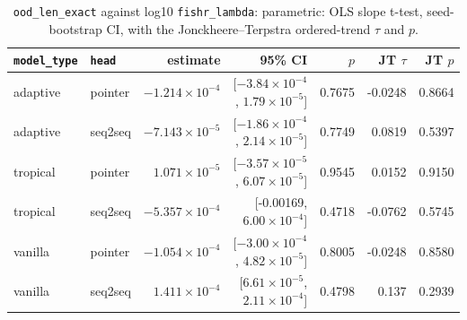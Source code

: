 \documentclass[10pt]{article}
\begin{document}
{\small
\begin{longtable}{llrrrrr}
\caption{\texttt{ood\_len\_exact} against log10 \texttt{fishr\_lambda}: parametric: OLS slope t-test, seed-bootstrap CI, with the Jonckheere--Terpstra ordered-trend $\tau$ and $p$.}\label{tab:trend-ood_len_exact}\\
\toprule
\texttt{model\_type} & \texttt{head} & estimate & 95\% CI & $p$ & JT $\tau$ & JT $p$\\
\midrule
\endhead
adaptive & pointer & $-1.214\times10^{-4}$ & [$-3.84\times10^{-4}$, $1.79\times10^{-5}$] & 0.7675 & -0.0248 & 0.8664\\
adaptive & seq2seq & $-7.143\times10^{-5}$ & [$-1.86\times10^{-4}$, $2.14\times10^{-5}$] & 0.7749 & 0.0819 & 0.5397\\
tropical & pointer & $1.071\times10^{-5}$ & [$-3.57\times10^{-5}$, $6.07\times10^{-5}$] & 0.9545 & 0.0152 & 0.9150\\
tropical & seq2seq & $-5.357\times10^{-4}$ & [-0.00169, $6.00\times10^{-4}$] & 0.4718 & -0.0762 & 0.5745\\
vanilla & pointer & $-1.054\times10^{-4}$ & [$-3.00\times10^{-4}$, $4.82\times10^{-5}$] & 0.8005 & -0.0248 & 0.8580\\
vanilla & seq2seq & $1.411\times10^{-4}$ & [$6.61\times10^{-5}$, $2.11\times10^{-4}$] & 0.4798 & 0.137 & 0.2939\\
\bottomrule
\end{longtable}
}
\end{document}

